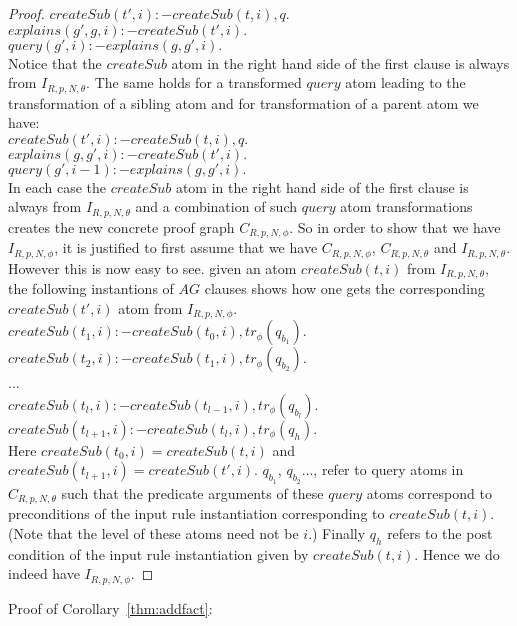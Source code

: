 \begin{proof}
$createSub(t',i):-createSub(t,i),q.$\\
$explains(g',g,i):-createSub(t',i).$\\
$query(g',i):-explains(g,g',i).$\\
Notice that the $createSub$ atom in the right hand side of the first clause is always from $I_{R,p,N,\theta}$. The same holds for a transformed $query$ atom leading to the transformation of a sibling atom and for transformation of a parent atom we have:\\
$createSub(t',i):-createSub(t,i),q.$\\
$explains(g,g',i):-createSub(t',i).$\\
$query(g',i-1):-explains(g,g',i).$\\
In each case the $createSub$ atom in the right hand side of the first clause is always from $I_{R,p,N,\theta}$ and a combination of such $query$ atom transformations creates the new concrete proof graph $C_{R,p,N,\phi}$. So in order to show that we have $I_{R,p,N,\phi}$, it is justified to first assume that we have $C_{R,p,N,\phi}$, $C_{R,p,N,\theta}$ and $I_{R,p,N,\theta}$. However this is now easy to see. given an atom $createSub(t,i)$ from $I_{R,p,N,\theta}$, the following instantions of $AG$ clauses shows how one gets the corresponding $createSub(t',i)$ atom from $I_{R,p,N,\phi}$.\\
$createSub(t_{1},i):-createSub(t_{0},i),tr_{\phi}(q_{b_{1}}).$\\
$createSub(t_{2},i):-createSub(t_{1},i),tr_{\phi}(q_{b_{2}}).$\\ ...\\
$createSub(t_{l},i):-createSub(t_{l-1},i),tr_{\phi}(q_{b_{l}}).$\\
$createSub(t_{l+1},i):-createSub(t_{l},i),tr_{\phi}(q_{h}).$\\
Here $createSub(t_{0},i) = createSub(t,i)$ and $createSub(t_{l+1},i) = createSub(t',i)$. $q_{b_{1}}$, $q_{b_{2}}$..., refer to query atoms in $C_{R,p,N,\theta}$  such that the predicate arguments of these $query$ atoms correspond to preconditions of the input rule instantiation corresponding to $createSub(t,i)$. (Note that the level of these atoms need not be $i$.) Finally $q_{h}$ refers to the post condition of the input rule instantiation given by $createSub(t,i)$. Hence we do indeed have $I_{R,p,N,\phi}$.
\end{proof}

Proof of Corollary~\ref{thm:addfact}:

